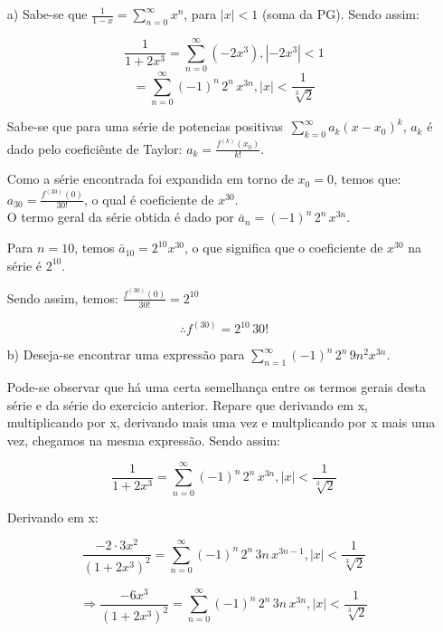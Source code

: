 \documentclass[12pt,a4paper]{article}
\begin{document}
\begin{itemize}
    \item[a)] Sabe-se que $ \displaystyle\frac{1}{1-x} = \displaystyle\sum_{n=0}^\infty x^n $, para $|x|<1$ (soma da PG). Sendo assim:
    
    $$\frac{1}{1 + 2x^3} = \sum_{n=0}^\infty (-2 x^3), |-2x^3| < 1$$
    $$ = \sum_{n=0}^\infty (-1)^n  \, 2^n \, x^{3n}, |x| < \frac{1}{\sqrt[3]{2}} $$
    
    
    Sabe-se que para uma série de potencias positivas $ \, \displaystyle\sum_{k=0}^\infty a_k (x-x_0)^k $, $a_k$ é dado pelo coeficiênte de Taylor: $a_k = \displaystyle\frac{f^{(k)}(x_0)}{k!}$.
    
    Como a série encontrada foi expandida em torno de $x_0 = 0$, temos que: $a_{30} = \displaystyle\frac{f^{(30)}(0)}{30!}$, o qual é coeficiente de $x^{30}$. \\
    
    O termo geral da série obtida é dado por $ \bar{a}_n = (-1)^n  \, 2^n \, x^{3n}$.
    
    Para $n=10$, temos $\bar{a}_{10} = 2^{10} x^{30}$, o que significa que o coeficiente de $x^{30}$ na série é $2^{10}$.
    
    Sendo assim, temos: $ \displaystyle\frac{f^{(30)}(0)}{30!} = 2^{10} $
    
    $$ \therefore f^{(30)} = 2^{10} \, 30! $$


    \item[b)] Deseja-se encontrar uma expressão para $\displaystyle\sum_{n=1}^\infty (-1)^n \, 2^n \, 9 n^2 x^{3n}$.
    
     Pode-se observar que há uma certa semelhança entre os termos gerais desta série e da série do exercicio anterior. Repare que derivando em x, multiplicando por x, derivando mais uma vez e multplicando por x mais uma vez, chegamos na mesma expressão. Sendo assim:
     
     $$\frac{1}{1 + 2x^3} =  \sum_{n=0}^\infty (-1)^n  \, 2^n \, x^{3n}, |x| < \frac{1}{\sqrt[3]{2}} $$
     
     Derivando em x:
     
     $$\frac{-2 \cdot 3 x^2}{(1 + 2x^3)^2} =  \sum_{n=0}^\infty (-1)^n  \, 2^n \, 3 n \, x^{3n-1}, |x| < \frac{1}{\sqrt[3]{2}} $$
     
     $$ \Rightarrow \frac{-6 x^3}{(1 + 2x^3)^2} =  \sum_{n=0}^\infty (-1)^n  \, 2^n \, 3 n \, x^{3n}, |x| < \frac{1}{\sqrt[3]{2}} $$
     

\end{itemize}
\end{document}
